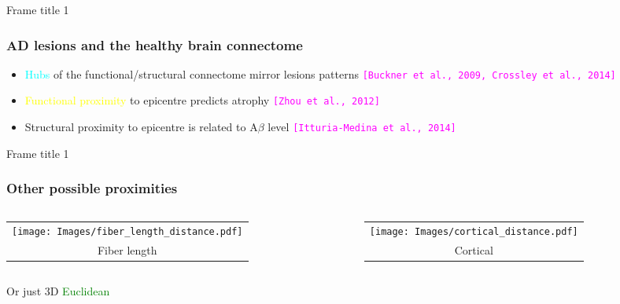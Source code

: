 \documentclass{beamer}
\newcommand{\myciting}[1]{{\footnotesize{\tt{\textcolor{magenta}{[#1]}}}}}
\begin{document}
\begin{frame}{Frame title 1}
\frametitle{AD lesions and the healthy brain connectome}
 \begin{itemize}
 \item {\textcolor{cyan}{Hubs}} of the functional/structural connectome mirror lesions patterns \myciting{Buckner et al., 2009, Crossley et al., 2014}
 \vspace*{0.02\linewidth}
 \item {\textcolor{yellow}{Functional proximity}} to epicentre predicts atrophy \myciting{Zhou et al., 2012}
 \vspace*{0.02\linewidth}
 \item Structural proximity to epicentre is related to A$\beta$ level \myciting{Itturia-Medina et al., 2014}
 \vspace*{0.02\linewidth}
 \end{itemize}
\end{frame}
\begin{frame}{Frame title 1}
\frametitle{Other possible proximities}
  \begin{center} 
    \begin{columns}

      \begin{column}{0.5\textwidth}
        \begin{tabular}{c} 
	   \texttt{[image: Images/fiber\_length\_distance.pdf]}\\
		{Fiber length}
        \end{tabular}   
      \end{column}

      \begin{column}{0.5\textwidth}
        \begin{tabular}{c} 
		\texttt{[image: Images/cortical\_distance.pdf]}\\
		{Cortical}
		\end{tabular}   
      \end{column}

     \end{columns}
     \vspace*{.1\textwidth}
	 Or just 3D {\textcolor{green}{Euclidean}}
   \end{center}

\end{frame}
\end{document}
